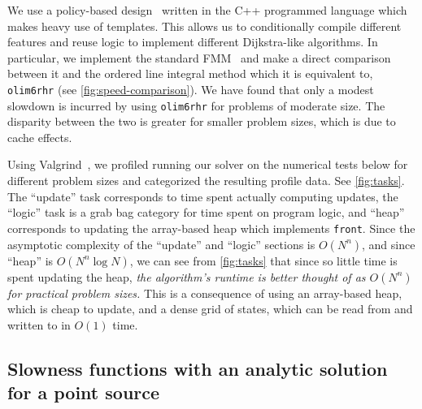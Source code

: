 \documentclass[sisc-eikonal.tex]{subfiles}
\begin{document}
We use a policy-based design~\cite{alexandrescu2001modern} written in
the C++ programmed language which makes heavy use of templates. This
allows us to conditionally compile different features and reuse logic
to implement different Dijkstra-like algorithms. In particular, we
implement the standard FMM~\cite{sethian1996fast} and make a direct
comparison between it and the ordered line integral method which it is
equivalent to, \texttt{olim6rhr} (see \cref{fig:speed-comparison}). We
have found that only a modest slowdown is incurred by using
\texttt{olim6rhr} for problems of moderate size. The disparity between
the two is greater for smaller problem sizes, which is due to cache
effects.

Using Valgrind~\cite{nethercote2007valgrind}, we profiled running our
solver on the numerical tests below for different problem sizes and
categorized the resulting profile data. See \cref{fig:tasks}. The
``update'' task corresponds to time spent actually computing updates,
the ``logic'' task is a grab bag category for time spent on program
logic, and ``heap'' corresponds to updating the array-based heap which
implements \texttt{front}. Since the asymptotic complexity of the
``update'' and ``logic'' sections is $O(N^n)$, and since ``heap'' is
$O(N^n \log N)$, we can see from \cref{fig:tasks} that since so little
time is spent updating the heap, \emph{the algorithm's runtime is
  better thought of as $O(N^n)$ for practical problem sizes.} This is
a consequence of using an array-based heap, which is cheap to update,
and a dense grid of states, which can be read from and written to in
$O(1)$ time.

\subsection[Single point source]{Slowness functions with an analytic
  solution for a point source}\label{ssec:point-source-problems}
\end{document}
